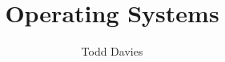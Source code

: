 \newcommand{\coursename}{Operating Systems}
\newcommand{\coursecode}{COMP25111}
\newcommand{\courseinfo}{}
\newcommand{\Author}{Todd Davies} 
\newcommand{\Title}{Operating Systems}
\author{\Author}
\title{\Title}
